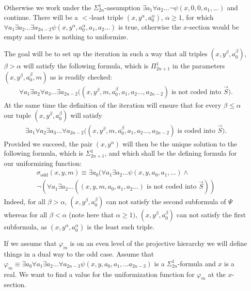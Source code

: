 \documentclass[a4paper,11pt]{article}
\begin{document}
Otherwise we work under the $\Sigma^1_{2n}$-assumption 
$\exists a_1 \forall a_2... \lnot \psi (x,0,0,a_1,...)$ and continue.
  There will be a $<$-least triple $(x,y^{\alpha}, a_0^{\alpha} )$, $\alpha \ge 1$, for which $\forall a_1 \exists a_2... \exists a_{2n-2} \psi (x,y^{\alpha},a^{\alpha}_0, a_1,a_2...)$ is true, otherwise the $x$-section would be empty and there is nothing to uniformize.

The goal will be to set up the iteration in such a way that all triples $(x,y^{\beta} ,a_0^{\beta})$, $\beta > \alpha$ will satisfy the following formula, which is $\Pi^1_{2n+1}$ in the parameters $( x , y^{\beta}, a^{\beta}_0 ,m)$ as is readily checked:
\begin{align*}
\forall a_{1} \exists a_{2} \forall a_{3}... \exists a_{2n-2} (( x,y^{\beta} ,m, a_0^{\beta},a_1,a_2...,a_{2n-2} )\text{ is not coded into $\vec{S} )$.}
\end{align*}
At the same time the definition of the iteration will ensure that for every $\beta \le \alpha$ our tuple $(x,y^{\beta}, a^{\beta}_0)$ will satisfy 
\begin{align*}
\exists a_{1} \forall a_{2} \exists a_{3}... \forall a_{2n-2} (( x,y^{\beta} ,m, a_0^{\beta},a_1,a_2...,a_{2n-2} )\text{ is  coded into $\vec{S} )$.}
\end{align*}
Provided we succeed, the pair $(x,y^{\alpha})$ will then be the unique solution to the following formula, which is $\Sigma^1_{2n+1}$, and which shall be the defining formula for our uniformizing function:
\begin{align*}
\sigma_{\text{odd}}(x,y,m) \equiv \exists a_0 ( \forall a_1 \exists a_2...\psi (x,y,a_0,a_1,...) \land \\
\lnot ( \forall a_1 \exists a_2... ( ( x,y ,m, a_0 ,a_1 ,a_2...) \text{ is not coded into $\vec{S}$}) )
\end{align*}
Indeed, for all $\beta> \alpha$, $(x,y^{\beta},a^{\beta}_0)$ can not satisfy the second subformula of $\Psi$ whereas for all
$\beta< \alpha$ (note here that $\alpha \ge 1)$, $(x,y^{\beta} , a_0^{\beta})$ can not satisfy the first subformula, as $(x,y^{\alpha}, a_0^{\alpha} )$ is the least such triple.


If we assume that $\varphi_m$ is on an even level of the projective hierarchy we will define things in a dual way to the odd case. 
Assume that $\varphi_m \equiv \exists a_0 \forall a_1 \exists a_2 ... \forall a_{2n-3} \psi( x,y,a_0,a_1,... a_{2n-3} )$ is a $\Sigma^1_{2n}$-formula and  $x$ is a real. We want to find a value for the uniformization function for $\varphi_m$ at the $x$-section.
\end{document}
